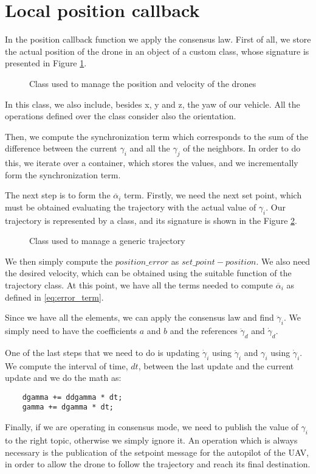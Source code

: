 \section{Local position callback\label{sec:local_position_callback}}

In the position callback function we apply the consensus law. First of all, we
store the actual position of the drone in an object of a custom class,
whose signature is presented in Figure \ref{fig:drone_pose}.
\begin{figure}
\centering
  
\caption{Class used to manage the position and velocity of the drones}
\label{fig:drone_pose}
\end{figure}
In this class, we also include, besides x, y and z, the yaw of our vehicle.
All the operations defined over the class consider also the orientation.

Then, we compute the synchronization term which corresponds to the sum of the
difference between the current $\gamma_i$ and all the $\gamma_j$ of the neighbors.
In order to do this, we iterate over a container, which stores the values, and
we incrementally form the synchronization term.

The next step is to form the $\overline{\alpha}_i$ term.
Firstly, we need the next set point, which must be obtained evaluating
the trajectory with the actual value of $\gamma_i$.
Our trajectory is represented by a class, and its signature is shown in the Figure
\ref{fig:loc_pos_callback_trajectory}.
\begin{figure}
\centering
  
\caption{Class used to manage a generic trajectory}
\label{fig:loc_pos_callback_trajectory}
\end{figure}
We then simply compute the $position\_error$ as $set\_point - position$.
We also need the desired velocity, which can be obtained using the suitable function
of the trajectory class.
At this point, we have all the terms needed to compute $\overline{\alpha}_i$
as defined in \ref{eq:error_term}.

Since we have all the elements, we can apply the consensus law and find
$\ddot{\gamma}_i$. We simply need to have the coefficients $a$ and $b$
and the references $\ddot{\gamma}_d$ and $\dot{\gamma}_d$.

One of the last steps that we need to do is updating $\dot{\gamma}_i$ using $\ddot{\gamma}_i$
and $\gamma_i$ using $\dot{\gamma}_i$. We compute the interval of time, $dt$, between the
last update and the current update and we do the math as:
\begin{lstlisting}
    dgamma += ddgamma * dt;
    gamma += dgamma * dt;
\end{lstlisting}

Finally, if we are operating in consensus mode, we need to publish the value of $\gamma_i$
to the right topic, otherwise we simply ignore it. An operation which is
always necessary is the publication of the setpoint message for the autopilot of
the UAV, in order to allow the drone to follow the trajectory and reach its final destination.
